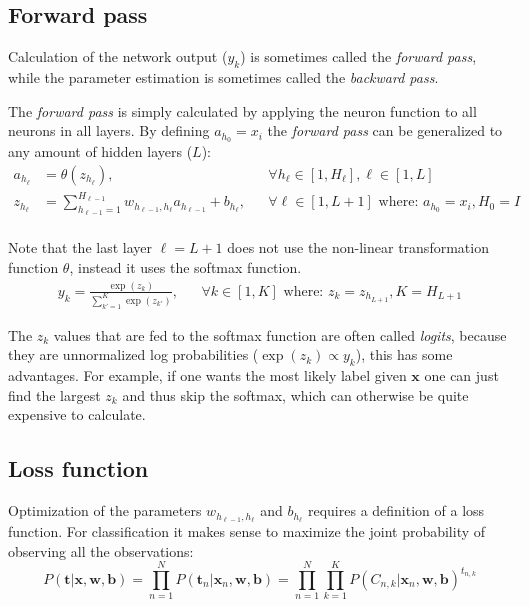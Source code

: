 \subsection{Forward pass}

Calculation of the network output ($y_k$) is sometimes called the \textit{forward pass}, while the parameter estimation is sometimes called the \textit{backward pass}.

The \textit{forward pass} is simply calculated by applying the neuron function to all neurons in all layers. By defining $a_{h_0} = x_i$ the \textit{forward pass} can be generalized to any amount of hidden layers ($L$):
\begin{equation}
\begin{aligned}
a_{h_\ell} &= \theta(z_{h_\ell}), && \forall h_{\ell} \in [1, H_{\ell}], \ell \in [1, L] \\
z_{h_\ell} &= \sum_{h_{\ell-1} = 1}^{H_{\ell-1}} w_{h_{\ell-1}, h_{\ell}} a_{h_{\ell-1}} + b_{h_{\ell}}, && \forall \ell \in [1, L+1] \text{ where: } a_{h_0} = x_i, H_0 = I \\
\end{aligned}
\end{equation}

Note that the last layer $\ell = L + 1$ does not use the non-linear transformation function $\theta$, instead it uses the softmax function.
\begin{equation}
\begin{aligned}
y_k = \frac{\exp(z_k)}{\sum_{k'=1}^K \exp(z_{k'})}, && \forall k \in [1, K] \text{ where: } z_k=z_{h_{L+1}}, K = H_{L + 1}
\end{aligned}
\label{eq:theory:ffnn:y}
\end{equation}

The $z_k$ values that are fed to the softmax function are often called \textit{logits}, because they are unnormalized log probabilities ($\exp(z_k) \propto y_k$), this has some advantages. For example, if one wants the most likely label given $\mathbf{x}$ one can just find the largest $z_k$ and thus skip the softmax, which can otherwise be quite expensive to calculate.

\subsection{Loss function}

Optimization of the parameters $w_{h_{\ell-1}, h_{\ell}}$ and $b_{h_{\ell}}$ requires a definition of a loss function. For classification it makes sense to maximize the joint probability of observing all the observations:
\begin{equation}
P(\mathbf{t} | \mathbf{x}, \mathbf{w}, \mathbf{b}) = \prod_{n=1}^N P(\mathbf{t}_n | \mathbf{x}_n, \mathbf{w}, \mathbf{b})  = \prod_{n=1}^N \prod_{k=1}^K P(C_{n, k} | \mathbf{x}_n, \mathbf{w}, \mathbf{b})^{t_{n, k}}
\end{equation}

